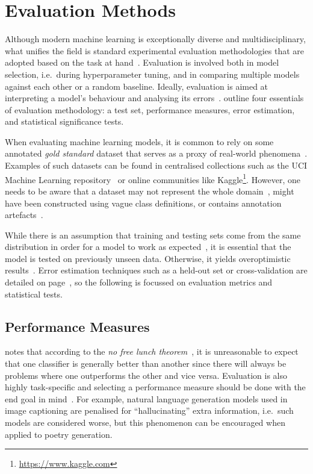 \chapter{Evaluation Methods}
\label{ch:evaluation-methods}

Although modern machine learning is exceptionally diverse and multidisciplinary, what unifies the field is standard experimental evaluation methodologies that are adopted based on the task at hand~\citep{Kibler1988}.
%
Evaluation is involved both in model selection, i.e.\ during hyperparameter tuning, and in comparing multiple models against each other or a random baseline.
Ideally, evaluation is aimed at interpreting a model's behaviour and analysing its errors~\citep{Doshi2017}.
%
\citet{Japkowic2011} outline four essentials of evaluation methodology: a test set, performance measures, error estimation, and statistical significance tests.

When evaluating machine learning models, it is common to rely on some annotated \emph{gold standard} dataset that serves as a proxy of real-world phenomena~\citep{Manning2008}.
%
Examples of such datasets can be found in centralised collections such as the UCI Machine Learning repository~\citep{Dua2017} or online communities like Kaggle\footnote{\url{https://www.kaggle.com}}.
However, one needs to be aware that a dataset
may not represent the whole domain~\citep{Japkowic2011},
might have been constructed using vague class definitions,
or contains annotation artefacts~\citep{Hand2006}.

While there is an assumption that training and testing sets come from the same distribution in order for a model to work as expected~\citep{Japkowic2011}, it is essential that the model is tested on previously unseen data.
Otherwise, it yields overoptimistic results~\citep{Kibler1988}.
%
Error estimation techniques such as a held-out set or cross-validation are detailed
on page~\pageref{ch:cross-validation}, so the following is focussed on evaluation metrics and statistical tests.

\section{Performance Measures}
\citet{Stapor17} notes that according to the \emph{no free lunch theorem}~\citep{Wolpert1996}, it is unreasonable to expect that one classifier is generally better than another since there will always be problems where one outperforms the other and vice versa.
Evaluation is also highly task-specific and selecting a performance measure should be done with the end goal in mind~\citep{goodfellow2016deeplearning}. For example, natural language generation models used in image captioning are penalised for ``hallucinating'' extra information, i.e.\ such models are considered worse, but this phenomenon can be encouraged when applied to poetry generation.

